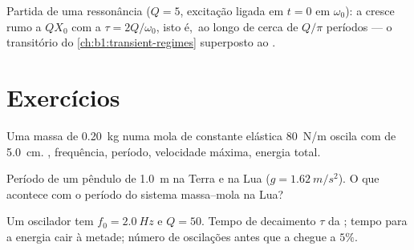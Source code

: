 \begin{omfigure}

{\small Partida de uma ressonância ($Q = 5$, excitação ligada em $t = 0$
em $\omega_0$): a  cresce rumo a $QX_0$ com a 
$\tau = 2Q/\omega_0$, isto é,\ ao longo de cerca de $Q/\pi$ períodos --- o transitório
do \cref{ch:b1:transient-regimes} superposto ao .}
\end{omfigure}

\section{Exercícios}

\begin{exercise}[$\star$]\label{exo:b1:oscillators-resonance:1}
Uma massa de \qty{0.20}{kg} numa mola de constante elástica \qty{80}{N/m} oscila
com  de \qty{5.0}{cm}. , frequência, período,
velocidade máxima, energia total.
\end{exercise}

\begin{exercise}[$\star$]\label{exo:b1:oscillators-resonance:2}
Período de um pêndulo de \qty{1.0}{m} na Terra e na Lua
($g = \qty{1.62}{m/s^2}$). O que acontece com o período do sistema massa--mola na
Lua?
\end{exercise}

\begin{exercise}[$\star$]\label{exo:b1:oscillators-resonance:3}
Um oscilador tem $f_0 = \qty{2.0}{Hz}$ e $Q = 50$. Tempo de decaimento $\tau$
da ; tempo para a energia cair à metade; número de oscilações
antes que a  chegue a $5\%$.
\end{exercise}

